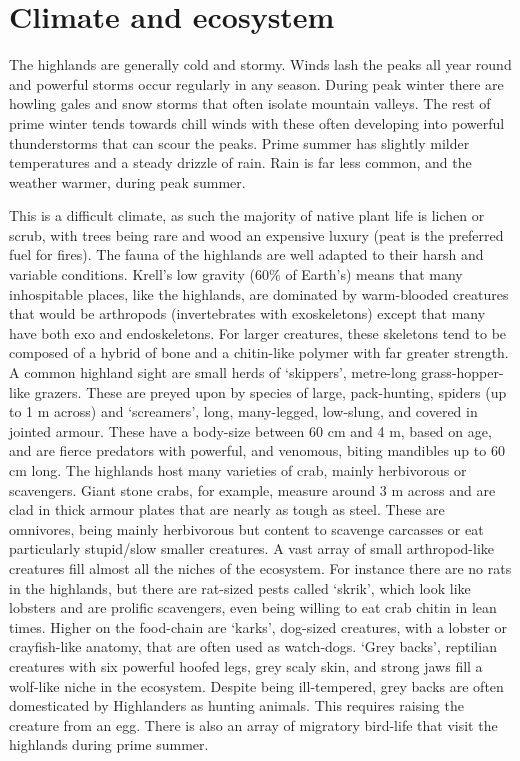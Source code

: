 \documentclass[a4paper,11pt,oneside]{book}
\begin{document}
\section{Climate and ecosystem}
The highlands are generally cold and stormy. Winds lash the peaks all year round and powerful storms occur regularly in any season. During peak winter there are howling gales and snow storms that often isolate mountain valleys. The rest of prime winter tends towards chill winds with these often developing into powerful thunderstorms that can scour the peaks. Prime summer has slightly milder temperatures and a steady drizzle of rain. Rain is far less common, and the weather warmer, during peak summer. 

This is a difficult climate, as such the majority of native plant life is lichen or scrub, with trees being rare and wood an expensive luxury (peat is the preferred fuel for fires). The fauna of the highlands are well adapted to their harsh and variable conditions. Krell's low gravity (60\% of Earth's) means that many inhospitable places, like the highlands, are dominated by warm-blooded creatures that would be arthropods (invertebrates with exoskeletons) except that many have both exo and endoskeletons. For larger creatures, these skeletons tend to be composed of a hybrid of bone and a chitin-like polymer with far greater strength. A common highland sight are small herds of `skippers', metre-long grass-hopper-like grazers. These are preyed upon by species of large, pack-hunting, spiders (up to 1 m across) and `screamers', long, many-legged, low-slung, and covered in jointed armour. These have a body-size between 60 cm and 4 m, based on age, and are fierce predators with powerful, and venomous, biting mandibles up to 60 cm long. The highlands host many varieties of crab, mainly herbivorous or scavengers. Giant stone crabs, for example, measure around 3 m across and are clad in thick armour plates that are nearly as tough as steel. These are omnivores, being mainly herbivorous but content to scavenge carcasses or eat particularly stupid/slow smaller creatures. A vast array of small arthropod-like creatures fill almost all the niches of the ecosystem. For instance there are no rats in the highlands, but there are rat-sized pests called `skrik', which look like lobsters and are prolific scavengers, even being willing to eat crab chitin in lean times. Higher on the food-chain are `karks', dog-sized creatures, with a lobster or crayfish-like anatomy, that are often used as watch-dogs. `Grey backs', reptilian creatures with six powerful hoofed legs, grey scaly skin, and strong jaws fill a wolf-like niche in the ecosystem. Despite being ill-tempered, grey backs are often domesticated by Highlanders as hunting animals. This requires raising the creature from an egg. There is also an array of migratory bird-life that visit the highlands during prime summer. 
\end{document}
